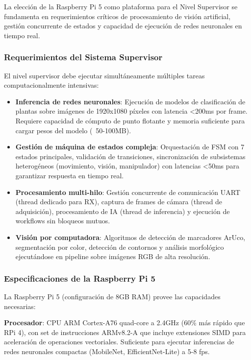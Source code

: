 La elección de la Raspberry Pi 5 como plataforma para el Nivel Supervisor se fundamenta en requerimientos críticos de procesamiento de visión artificial, gestión concurrente de estados y capacidad de ejecución de redes neuronales en tiempo real.

\subsubsection{Requerimientos del Sistema Supervisor}

El nivel supervisor debe ejecutar simultáneamente múltiples tareas computacionalmente intensivas:

\begin{itemize}
    \item \textbf{Inferencia de redes neuronales}: Ejecución de modelos de clasificación de plantas sobre imágenes de 1920x1080 píxeles con latencia <200ms por frame. Requiere capacidad de cómputo de punto flotante y memoria suficiente para cargar pesos del modelo (~50-100MB).

    \item \textbf{Gestión de máquina de estados compleja}: Orquestación de FSM con 7 estados principales, validación de transiciones, sincronización de subsistemas heterogéneos (movimiento, visión, manipulador) con latencias <50ms para garantizar respuesta en tiempo real.

    \item \textbf{Procesamiento multi-hilo}: Gestión concurrente de comunicación UART (thread dedicado para RX), captura de frames de cámara (thread de adquisición), procesamiento de IA (thread de inferencia) y ejecución de workflows sin bloqueos mutuos.

    \item \textbf{Visión por computadora}: Algoritmos de detección de marcadores ArUco, segmentación por color, detección de contornos y análisis morfológico ejecutándose en pipeline sobre imágenes RGB de alta resolución.
\end{itemize}

\subsubsection{Especificaciones de la Raspberry Pi 5}

La Raspberry Pi 5 (configuración de 8GB RAM) provee las capacidades necesarias:

\textbf{Procesador}: CPU ARM Cortex-A76 quad-core a 2.4GHz (60\% más rápido que RPi 4), con set de instrucciones ARMv8.2-A que incluye extensiones SIMD para aceleración de operaciones vectoriales. Suficiente para ejecutar inferencias de redes neuronales compactas (MobileNet, EfficientNet-Lite) a 5-8 fps.

